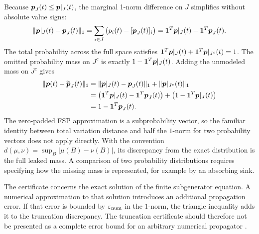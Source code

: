 \documentclass[../main.tex]{subfiles}
\begin{document}
{Because $\boldsymbol{p}_J(t) \leq \boldsymbol{p}|_J(t)$, the marginal 1-norm difference on $J$ simplifies without absolute value signs:
\begin{align*}
    \|\boldsymbol{p}|_J(t) - \boldsymbol{p}_J(t)\|_1
    =
    \sum_{i \in J} \big( p_i(t) - [\boldsymbol{p}_J(t)]_i \big)
    =
    \mathbf{1}^T\boldsymbol{p}|_J(t) - \mathbf{1}^T\boldsymbol{p}_J(t).
\end{align*}
The total probability across the full space satisfies $\mathbf{1}^T\boldsymbol{p}|_J(t) + \mathbf{1}^T\boldsymbol{p}|_{J^c}(t) = 1$. The omitted probability mass on $J^c$ is exactly $1 - \mathbf{1}^T\boldsymbol{p}|_J(t)$. Adding the unmodeled mass on $J^c$ gives
\begin{align*}
    \|\boldsymbol{p}(t) - \widetilde{\boldsymbol{p}}_J(t)\|_1
    &=
    \|\boldsymbol{p}|_J(t) - \boldsymbol{p}_J(t)\|_1 + \|\boldsymbol{p}|_{J^c}(t)\|_1 \\
    &=
    \big(\mathbf{1}^T\boldsymbol{p}|_J(t) - \mathbf{1}^T\boldsymbol{p}_J(t)\big) + \big(1 - \mathbf{1}^T\boldsymbol{p}|_J(t)\big) \\
    &=
    1 - \mathbf{1}^T\boldsymbol{p}_J(t).
\end{align*}
The zero-padded FSP approximation is a subprobability vector, so the familiar identity between total variation distance and half the $1$-norm for two probability vectors does not apply directly. With the convention $d(\mu,\nu)=\sup_B|\mu(B)-\nu(B)|$, its discrepancy from the exact distribution is the full leaked mass. A comparison of two probability distributions requires specifying how the missing mass is represented, for example by an absorbing sink.


The certificate concerns the exact solution of the finite subgenerator equation. A numerical approximation to that solution introduces an additional propagation error. If that error is bounded by $\varepsilon_{\rm num}$ in the $1$-norm, the triangle inequality adds it to the truncation discrepancy. The truncation certificate should therefore not be presented as a complete error bound for an arbitrary numerical propagator \citep{munskykhammash2006}.
}

\end{document}
